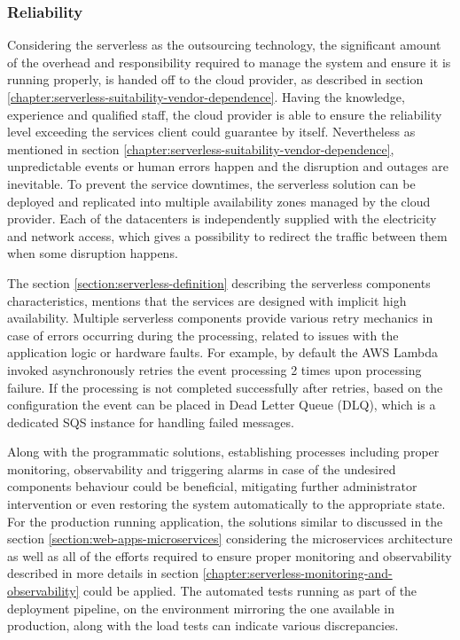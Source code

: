
\subsubsection{Reliability} \label{chapter:serverless-suitability-reliability}

Considering the serverless as the outsourcing technology, the significant amount of the overhead and responsibility required to manage the system and ensure it is running properly, is handed off to the cloud provider, as described in section \ref{chapter:serverless-suitability-vendor-dependence}. Having the knowledge, experience and qualified staff, the cloud provider is able to ensure the reliability level exceeding the services client could guarantee by itself. Nevertheless as mentioned in section \ref{chapter:serverless-suitability-vendor-dependence}, unpredictable events or human errors happen and the disruption and outages are inevitable. To prevent the service downtimes, the serverless solution can be deployed and replicated into multiple availability zones managed by the cloud provider. Each of the datacenters is independently supplied with the electricity and network access, which gives a possibility to redirect the traffic between them when some disruption happens.

The section \ref{section:serverless-definition} describing the serverless components characteristics, mentions that the services are designed with implicit high availability. Multiple serverless components provide various retry mechanics in case of errors occurring during the processing, related to issues with the application logic or hardware faults. For example, by default the AWS Lambda invoked asynchronously retries the event processing 2 times upon processing failure. If the processing is not completed successfully after retries, based on the configuration the event can be placed in Dead Letter Queue (DLQ), which is a dedicated SQS instance for handling failed messages.

Along with the programmatic solutions, establishing processes including proper monitoring, observability and triggering alarms in case of the undesired components behaviour could be beneficial, mitigating further administrator intervention or even restoring the system automatically to the appropriate state.
For the production running application, the solutions similar to discussed in the section \ref{section:web-apps-microservices} considering the microservices architecture as well as all of the efforts required to ensure proper monitoring and observability described in more details in section \ref{chapter:serverless-monitoring-and-observability} could be applied.
The automated tests running as part of the deployment pipeline, on the environment mirroring the one available in production, along with the load tests can indicate various discrepancies.

